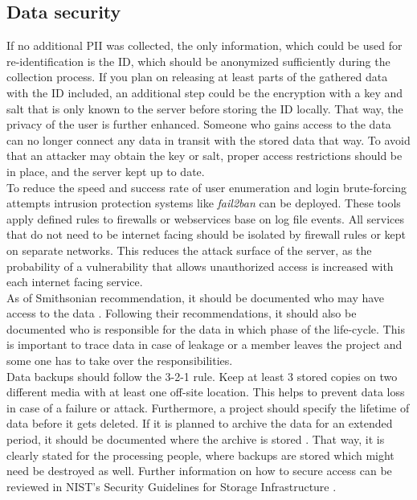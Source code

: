     \subsection{Data security}
        \label{subsec:data_storage}    
        If no additional PII was collected, the only information, which could be used for re-identification is the ID, which should be anonymized sufficiently during the collection process. If you plan on releasing at least parts of the gathered data with the ID included, an additional step could be the encryption with a key and salt that is only known to the server before storing the ID locally. That way, the privacy of the user is further enhanced. Someone who gains access to the data can no longer connect any data in transit with the stored data that way.
        To avoid that an attacker may obtain the key or salt, proper access restrictions should be in place, and the server kept up to date.\\
        To reduce the speed and success rate of user enumeration and login brute-forcing attempts intrusion protection systems like \textit{fail2ban} \cite{noauthor_fail2ban_nodate} can be deployed. These tools apply defined rules to firewalls or webservices base on log file events. All services that do not need to be internet facing should be isolated by firewall rules or kept on separate networks. This reduces the attack surface of the server, as the probability of a  vulnerability that allows unauthorized access is increased with each internet facing service.\\
        As of Smithsonian recommendation, it should be documented who may have access to the data \cite{noauthor_best_2018}. Following their recommendations, it should also be documented who is responsible for the data in which phase of the life-cycle. This is important to trace data in case of leakage or a member leaves the project and some one has to take over the responsibilities.\\
        Data backups should follow the 3-2-1 rule. Keep at least 3 stored copies on two different media with at least one off-site location. This helps to prevent data loss in case of a failure or attack.
        Furthermore, a project should specify the lifetime of data before it gets deleted. If it is planned to archive the data for an extended period, it should be documented where the archive is stored \cite{noauthor_best_2018}. That way, it is clearly stated for the processing people, where backups are stored which might need be destroyed as well.
        Further information on how to secure access can be reviewed in NIST's Security Guidelines for Storage Infrastructure \cite{chandramouli_security_2020}. \\
